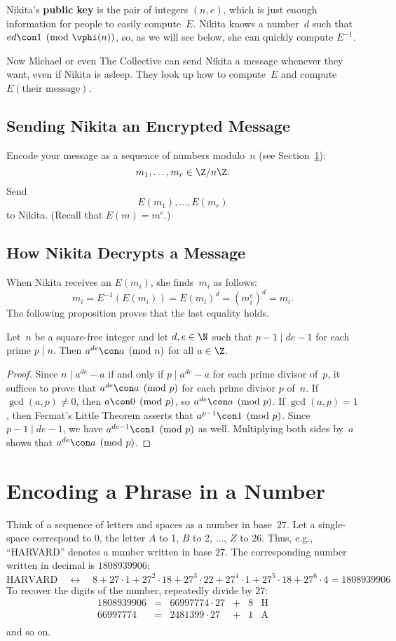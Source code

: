 \documentclass[11pt]{report}
\begin{document}
Nikita's {\bf public key} is the pair of integers $(n,e)$, which is
just enough information for people to easily compute~$E$.
Nikita knows a number~$d$ such that $ed\con 1\pmod{\vphi(n)}$,
so, as we will see below, she can quickly compute $E^{-1}$.

Now Michael or even The Collective can send Nikita a message whenever
they want, even if Nikita is asleep.  They look up how to compute~$E$
and compute $E(\text{their message})$.

\subsection{Sending Nikita an Encrypted Message}
Encode your message as a sequence
of numbers modulo~$n$ (see Section~\ref{sec:encode}):
$$
  m_1, \ldots, m_r \in \Z/n\Z.
$$
Send
$$
  E(m_1), \ldots, E(m_r)
$$
to Nikita.   (Recall that $E(m) = m^e$.)

\subsection{How Nikita Decrypts a Message}
When Nikita receives an $E(m_i)$, she finds~$m_i$ as follows:
$$
  m_i = E^{-1}(E(m_i))  = E(m_i)^d = (m_i^{e})^{d}=m_i.
$$
The following proposition proves that the last equality holds.
\begin{proposition}
  Let~$n$ be a square-free integer and let $d,e\in\N$ such that
  $p-1\mid de-1$ for each prime $p\mid n$.  Then
  $a^{de} \con a\pmod{n}$ for all $a\in\Z$.
\end{proposition}
\begin{proof}
  Since $n\mid a^{de}-a$ if and only if $p\mid a^{de}-a$ for each prime
  divisor of~$p$, it suffices to prove that $a^{de}\con a\pmod{p}$ for
  each prime divisor $p$ of~$n$.  If $\gcd(a,p)\neq 0$, then
  $a\con 0\pmod{p}$, so $a^{de} \con a\pmod{p}$.
  If $\gcd(a,p)=1$, then Fermat's Little
  Theorem asserts that $a^{p-1}\con 1\pmod{p}$.
  Since $p-1\mid de-1$, we have $a^{de-1} \con 1\pmod{p}$
  as well.  Multiplying both sides
  by~$a$ shows that $a^{de}\con a\pmod{p}$.
\end{proof}

\section{Encoding a Phrase in a Number}\label{sec:encode}
Think of a sequence of letters and spaces as a number in base~$27$.
Let a single-space correspond to $0$, the letter $A$ to 1, $B$ to 2,
..., $Z$ to 26.  Thus, e.g., ``HARVARD'' denotes a number written in
base $27$.  The corresponding number written in decimal is $1808939906$:
$$
  \text{HARVARD}\quad\leftrightarrow\quad
  8 + 27\cdot 1 + 27^2\cdot 18 + 27^3\cdot22 + 27^4\cdot1+27^5\cdot18 + 27^6\cdot 4
  = 1808939906
$$
To recover the digits of the number, repeatedly divide by $27$:
$$
  \begin{array}{lcrcrr}
    1808939906 & = & 66997774\cdot 27 & + & 8 & \text{H} \\
    66997774   & = & 2481399\cdot 27  & + & 1 & \text{A} \\
  \end{array}
$$
and so on.
\end{document}
